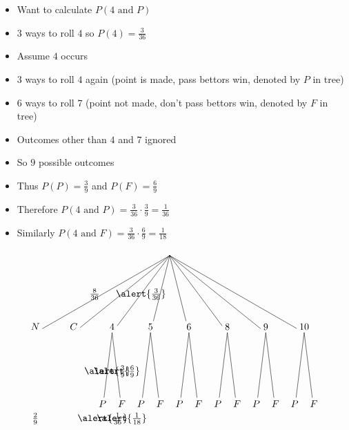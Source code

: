 \documentclass{beamer}
\theoremstyle{definition}
\begin{document}
\begin{frame}
\begin{itemize}
\item Want to calculate $P\left(\text{$4$ and $P$}\right)$
\item $3$ ways to roll $4$ so $P\left(4\right)=\frac{3}{36}$
\item Assume $4$ occurs
\item $3$ ways to roll $4$ again (point is made, pass
bettors win, denoted by \alert{$P$} in tree)
\item $6$ ways to roll $7$ (point not made, don't pass
bettors win, denoted by \alert{$F$} in tree)
\item Outcomes other than $4$ and $7$ ignored
\item So $9$ possible outcomes
\item Thus $P\left(P\right)=\frac{3}{9}$
and $P\left(F\right)=\frac{6}{9}$
\item Therefore
$P\left(\text{$4$ and $P$}\right)
=\frac{3}{36}\cdot\frac{3}{9}=\frac{1}{36}$
\item Similarly $P\left(\text{$4$ and $F$}\right)
=\frac{3}{36}\cdot\frac{6}{9}=\frac{1}{18}$
\end{itemize}
\end{frame}

\begin{frame}
\[\begin{xy}<1.4cm,0cm>:
(4.5,0)="0";
(1,-2)="N";(2,-2)="C";(3,-2)="4";(4,-2)="5";
(5,-2)="6";(6,-2)="8";(7,-2)="9";(8,-2)="10";
"0";"N"*+!D{N}**\dir{-}?*+!R{\frac{8}{36}};
"0";"C"*+!D{C}**\dir{-};
"0";"4"*+!D{4}**\dir{-}?*{\alert{\frac{3}{36}}};
"0";"5"*+!D{5}**\dir{-};
"0";"6"*+!D{6}**\dir{-};
"0";"8"*+!D{8}**\dir{-};
"0";"9"*+!D{9}**\dir{-};
"0";"10"*+!D{10}**\dir{-};
"4";(2.75,-4)*+!D{P}**\dir{-}?*{\alert{\frac{3}{9}}};
"4";(3.25,-4)*+!D{F}**\dir{-}?*{\alert{\frac{6}{9}}};
"5";(3.75,-4)*+!D{P}**\dir{-};
"5";(4.25,-4)*+!D{F}**\dir{-};
"6";(4.75,-4)*+!D{P}**\dir{-};
"6";(5.25,-4)*+!D{F}**\dir{-};
"8";(5.75,-4)*+!D{P}**\dir{-};
"8";(6.25,-4)*+!D{F}**\dir{-};
"9";(6.75,-4)*+!D{P}**\dir{-};
"9";(7.25,-4)*+!D{F}**\dir{-};
"10";(7.75,-4)*+!D{P}**\dir{-};
"10";(8.25,-4)*+!D{F}**\dir{-};
(1,-4)*+!U{\frac{2}{9}};
(2.75,-4)*+!U{\alert{\frac{1}{36}}};
(3.25,-4)*+!U{\alert{\frac{1}{18}}};
\end{xy}\]
\end{frame}
\end{document}
